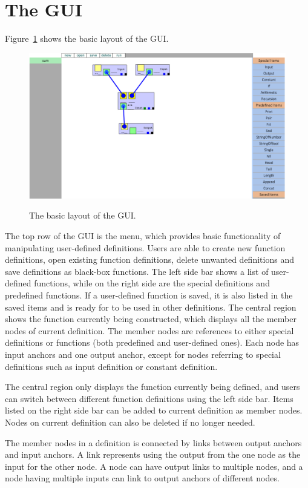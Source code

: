 \documentclass[12pt,UTF8,a4]{article}
\begin{document}
\section{The GUI}
Figure~\ref{fig:gui} shows the basic layout of the GUI.
\begin{figure}[!ht]
\center
\includegraphics[width=.95\textwidth]{./images/gui.png} \\
\caption{The basic layout of the GUI.}\label{fig:gui}
\end{figure}
The top row of the GUI is the menu, which provides basic functionality
of manipulating user-defined definitions. Users are able to create new
function definitions, open existing function definitions, delete
unwanted definitions and save definitions as black-box functions. The
left side bar shows a list of user-defined functions, while on the
right side are the special definitions and predefined functions. If a
user-defined function is saved, it is also listed in the saved items
and is ready for to be used in other definitions. The central region
shows the function currently being constructed, which displays all the
member nodes of current definition. The member nodes are references to
either special definitions or functions (both predefined and
user-defined ones). Each node has input anchors and one output anchor,
except for nodes referring to special definitions such as input
definition or constant definition.

The central region only displays the function currently being defined,
and users can switch between different function definitions using the
left side bar. Items listed on the right side bar can be added to
current definition as member nodes. Nodes on current definition can
also be deleted if no longer needed.

The member nodes in a definition is connected by links between output
anchors and input anchors. A link represents using the output from the
one node as the input for the other node. A node can have output links
to multiple nodes, and a node having multiple inputs can link to
output anchors of different nodes.
\end{document}
